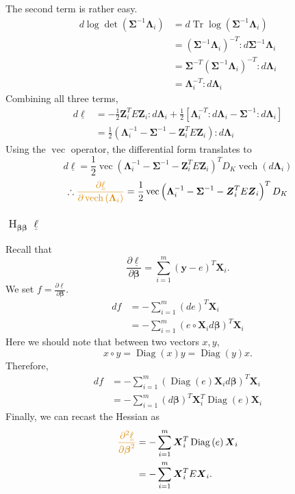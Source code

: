 \documentclass[11pt]{article}
\DeclareMathOperator{\Tr}{Tr}
\newcommand{\bs}{\boldsymbol}
\newcommand{\opn}{\operatorname}
\begin{document}
The second term is rather easy.
\begin{align*}
  d \log \det \left(\bs{\Sigma}^{-1}\bs{\Lambda}_{i} \right) &= d \Tr \log \left(\bs{\Sigma}^{-1}\bs{\Lambda}_{i} \right)\\
  &= \left(\bs{\Sigma}^{-1}\bs{\Lambda}_{i} \right)^{-T}:d\bs{\Sigma}^{-1}\bs{\Lambda}_{i}\\
  &= \bs{\Sigma}^{-T}\left(\bs{\Sigma}^{-1}\bs{\Lambda}_{i} \right)^{-T}: d\bs{\Lambda}_{i}\\
  &= \bs{\Lambda}_{i}^{-T}:d\bs{\Lambda}_{i}
\end{align*}
Combining all three terms,
\begin{align*}
  d\underline{\ell} &= -\frac{1}{2}\bs{Z}_{i}^{T}E\bs{Z}_{i} : d\bs{\Lambda}_{i} + \frac{1}{2} \left[\bs{\Lambda}_{i}^{-T}: d\bs{\Lambda}_{i} - \bs{\Sigma}^{-1}:d\bs{\Lambda}_{i} \right]\\
  &= \frac{1}{2}\left(\bs{\Lambda}_{i}^{-1}-\bs{\Sigma}^{-1} - \bs{Z}_{i}^{T}E\bs{Z}_{i} \right):d\bs{\Lambda}_{i}
\end{align*}
Using the $\opn{vec}$ operator, the differential form translates to
$$
  d\underline{\ell} = \frac{1}{2}\opn{vec}\left(\bs{\Lambda}_{i}^{-1} - \bs{\Sigma}^{-1}- \bs{Z}_{i}^{T}E\bs{Z}_{i} \right)^{T}D_{K}\opn{vech}\left(d\bs{\Lambda}_{i} \right)
$$
$$
  \therefore \textcolor{myorange}{\frac{\partial \underline{\ell}}{\partial \opn{vech}\left(\bs{\Lambda}_{i} \right)}} = \frac{1}{2}\opn{vec}\left(\bs{\Lambda}_{i}^{-1} - \bs{\Sigma}^{-1}- \bs{Z}_{i}^{T}E\bs{Z}_{i} \right)^{T}D_{K}
$$

\subsubsection{$\opn{H}_{\bs{\beta\beta}}\underline{\ell}$ }
Recall that
$$
  \frac{\partial \underline{\ell}}{\partial \bs{\beta}} = \sum_{i=1}^{m}\left(\bs{y} - e \right)^{T}\bs{X}_{i}.
$$
We set $f = \frac{\partial \underline{\ell}}{\partial \bs{\beta}}$.
\begin{align*}
  df &= -\sum_{i=1}^{m} \left(de\right)^{T}\bs{X}_{i}\\
  &= -\sum_{i=1}^{m} \left(e \circ \bs{X}_{i}d\bs{\beta} \right)^{T}\bs{X}_{i}
\end{align*}
Here we should note that between two vectors $x, y$,
$$
  x \circ y = \opn{Diag}\left(x \right)y = \opn{Diag}\left(y \right)x.
$$
Therefore,
\begin{align*}
  df &= -\sum_{i=1}^{m} \left(\opn{Diag}\left(e \right)\bs{X}_{i}d\bs{\beta} \right)^{T}\bs{X}_{i}\\
  &= -\sum_{i=1}^{m} \left(d\bs{\beta} \right)^{T}\bs{X}_{i}^{T}\opn{Diag}\left(e \right)\bs{X}_{i}
\end{align*}
Finally, we can recast the Hessian as
\begin{align*}
  \textcolor{myorange}{\frac{\partial^{2} \underline{\ell}}{\partial \bs{\beta}^{2}}} &= -\sum_{i=1}^{m} \bs{X}_{i}^{T}\opn{Diag}\left(e \right) \bs{X}_{i}\\
  &= -\sum_{i=1}^{m} \bs{X}_{i}^{T}E\bs{X}_{i}.
\end{align*}
\end{document}
